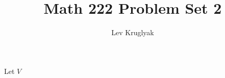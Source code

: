 \documentclass{lkx_pset}
\title{Math 222 Problem Set 2}
\author{Lev Kruglyak}
\begin{document}
\maketitle

\begin{problem}{6}
 Let $V$
\end{problem}
\end{document}
